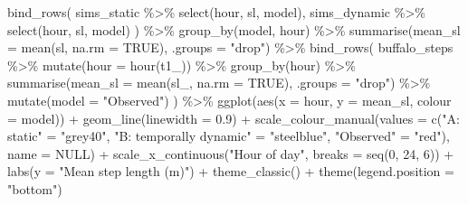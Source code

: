 \documentclass[
  letterpaper,
  DIV=11,
  numbers=noendperiod]{scrartcl}
\newenvironment{Shaded}{\begin{snugshade}}{\end{snugshade}}
\newcommand{\AttributeTok}[1]{\textcolor[rgb]{0.40,0.45,0.13}{#1}}
\newcommand{\ConstantTok}[1]{\textcolor[rgb]{0.56,0.35,0.01}{#1}}
\newcommand{\DecValTok}[1]{\textcolor[rgb]{0.68,0.00,0.00}{#1}}
\newcommand{\FloatTok}[1]{\textcolor[rgb]{0.68,0.00,0.00}{#1}}
\newcommand{\FunctionTok}[1]{\textcolor[rgb]{0.28,0.35,0.67}{#1}}
\newcommand{\NormalTok}[1]{\textcolor[rgb]{0.00,0.23,0.31}{#1}}
\newcommand{\OtherTok}[1]{\textcolor[rgb]{0.00,0.23,0.31}{#1}}
\newcommand{\SpecialCharTok}[1]{\textcolor[rgb]{0.37,0.37,0.37}{#1}}
\newcommand{\StringTok}[1]{\textcolor[rgb]{0.13,0.47,0.30}{#1}}
\begin{document}
\begin{Shaded}
\begin{Highlighting}[]
\FunctionTok{bind\_rows}\NormalTok{(}
\NormalTok{  sims\_static  }\SpecialCharTok{\%\textgreater{}\%} \FunctionTok{select}\NormalTok{(hour, sl, model),}
\NormalTok{  sims\_dynamic }\SpecialCharTok{\%\textgreater{}\%} \FunctionTok{select}\NormalTok{(hour, sl, model)}
\NormalTok{) }\SpecialCharTok{\%\textgreater{}\%}
  \FunctionTok{group\_by}\NormalTok{(model, hour) }\SpecialCharTok{\%\textgreater{}\%}
  \FunctionTok{summarise}\NormalTok{(}\AttributeTok{mean\_sl =} \FunctionTok{mean}\NormalTok{(sl, }\AttributeTok{na.rm =} \ConstantTok{TRUE}\NormalTok{), }\AttributeTok{.groups =} \StringTok{"drop"}\NormalTok{) }\SpecialCharTok{\%\textgreater{}\%}
  \FunctionTok{bind\_rows}\NormalTok{(}
\NormalTok{    buffalo\_steps }\SpecialCharTok{\%\textgreater{}\%}
      \FunctionTok{mutate}\NormalTok{(}\AttributeTok{hour =} \FunctionTok{hour}\NormalTok{(t1\_)) }\SpecialCharTok{\%\textgreater{}\%}
      \FunctionTok{group\_by}\NormalTok{(hour) }\SpecialCharTok{\%\textgreater{}\%}
      \FunctionTok{summarise}\NormalTok{(}\AttributeTok{mean\_sl =} \FunctionTok{mean}\NormalTok{(sl\_, }\AttributeTok{na.rm =} \ConstantTok{TRUE}\NormalTok{), }\AttributeTok{.groups =} \StringTok{"drop"}\NormalTok{) }\SpecialCharTok{\%\textgreater{}\%}
      \FunctionTok{mutate}\NormalTok{(}\AttributeTok{model =} \StringTok{"Observed"}\NormalTok{)}
\NormalTok{  ) }\SpecialCharTok{\%\textgreater{}\%}
  \FunctionTok{ggplot}\NormalTok{(}\FunctionTok{aes}\NormalTok{(}\AttributeTok{x =}\NormalTok{ hour, }\AttributeTok{y =}\NormalTok{ mean\_sl, }\AttributeTok{colour =}\NormalTok{ model)) }\SpecialCharTok{+}
  \FunctionTok{geom\_line}\NormalTok{(}\AttributeTok{linewidth =} \FloatTok{0.9}\NormalTok{) }\SpecialCharTok{+}
  \FunctionTok{scale\_colour\_manual}\NormalTok{(}\AttributeTok{values =} \FunctionTok{c}\NormalTok{(}\StringTok{"A: static"} \OtherTok{=} \StringTok{"grey40"}\NormalTok{,}
                                 \StringTok{"B: temporally dynamic"} \OtherTok{=} \StringTok{"steelblue"}\NormalTok{,}
                                 \StringTok{"Observed"} \OtherTok{=} \StringTok{"red"}\NormalTok{), }\AttributeTok{name =} \ConstantTok{NULL}\NormalTok{) }\SpecialCharTok{+}
  \FunctionTok{scale\_x\_continuous}\NormalTok{(}\StringTok{"Hour of day"}\NormalTok{, }\AttributeTok{breaks =} \FunctionTok{seq}\NormalTok{(}\DecValTok{0}\NormalTok{, }\DecValTok{24}\NormalTok{, }\DecValTok{6}\NormalTok{)) }\SpecialCharTok{+}
  \FunctionTok{labs}\NormalTok{(}\AttributeTok{y =} \StringTok{"Mean step length (m)"}\NormalTok{) }\SpecialCharTok{+}
  \FunctionTok{theme\_classic}\NormalTok{() }\SpecialCharTok{+}
  \FunctionTok{theme}\NormalTok{(}\AttributeTok{legend.position =} \StringTok{"bottom"}\NormalTok{)}
\end{Highlighting}
\end{Shaded}
\end{document}
